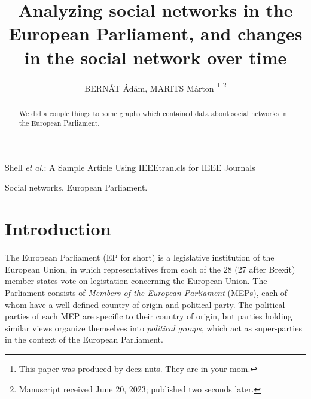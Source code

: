 \documentclass[lettersize,journal]{IEEEtran}
\begin{document}
\title{Analyzing social networks in the European Parliament, and changes in the social network over time}

\author{{BERNÁT Ádám, MARITS Márton}
\thanks{This paper was produced by deez nuts. They are in your mom.}%
\thanks{Manuscript received June 20, 2023; published two seconds later.}}

%
{Shell \MakeLowercase{\textit{et al.}}: A Sample Article Using IEEEtran.cls for IEEE Journals}


\maketitle

\begin{abstract}
We did a couple things to some graphs which contained data about social networks in the European Parliament.
\end{abstract}

\begin{IEEEkeywords}
Social networks, European Parliament.
\end{IEEEkeywords}

\section{Introduction}



The European Parliament (EP for short) is a legislative institution of the European Union, in which representatives from each of the 28 (27 after Brexit) member states vote on legistation concerning the European Union. The Parliament consists of \textit{Members of the European Parliament} (MEPs), each of whom have a well-defined country of origin and political party. The political parties of each MEP are specific to their country of origin, but parties holding similar views organize themselves into \textit{political groups}, which act as super-parties in the context of the European Parliament.
\end{document}
